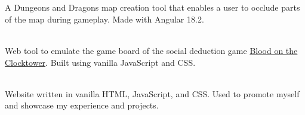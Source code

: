 \documentclass[10pt,a4paper,ragged2e,withhyper]{altacv}
\begin{document}

\\\smallskip
{}


 \\\smallskip
A Dungeons and Dragons map creation tool that enables a user to occlude parts of the map during gameplay\@. Made with Angular 18.2\@.

\divider{}

 \\\smallskip
Web tool to emulate the game board of the social deduction game \href{https://bloodontheclocktower.com/}{Blood on the Clocktower}\@. Built using vanilla JavaScript and CSS\@.

\divider{}

 \\\smallskip
Website written in vanilla HTML, JavaScript, and CSS\@.
Used to promote myself and showcase my experience
and projects\@.




\smallskip
{}
\begin{paracol}{4}
\switchcolumn[1]
\switchcolumn[2]
\switchcolumn[3]
\end{paracol}
\end{document}
